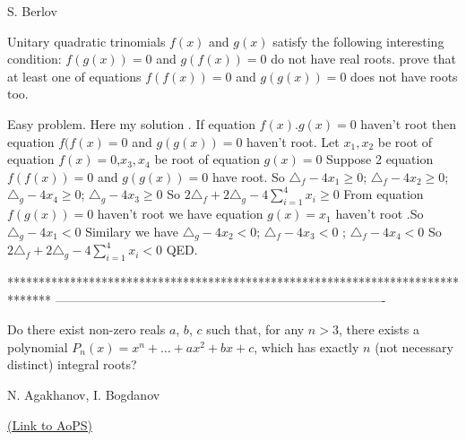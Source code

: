 \begin{solution}
	\begin{tcolorbox}\begin{italicized}S. Berlov \end{italicized}
Unitary quadratic trinomials $ f(x)$ and $ g(x)$ satisfy
the following interesting condition: $ f(g(x)) = 0$ and $ g(f(x)) = 0$ 
do not have real roots. prove that at least one of equations
$ f(f(x)) = 0$ and $ g(g(x)) = 0$ does not have roots too.\end{tcolorbox}
Easy problem. Here my solution   .
If equation $ f(x).g(x) = 0$ haven't root then equation $ f(f(x) = 0$ and $ g(g(x)) = 0$ haven't root.
Let $ x_1,x_2$ be root of equation $ f(x) = 0$,$ x_3,x_4$ be root of equation $ g(x) = 0$
Suppose 2 equation $ f(f(x)) = 0$ and $ g(g(x)) = 0$ have root.
So $ \triangle_f - 4x_1\geq 0$; $ \triangle_f - 4x_2\geq 0$; $ \triangle_g - 4x_4\geq 0$; $ \triangle_g - 4x_3\geq 0$
So $ 2\triangle_f + 2\triangle_g - 4\sum_{i = 1}^{4}x_i\geq 0$
From equation $ f(g(x)) = 0$ haven't root  we have equation $ g(x) = x_1$ haven't root .So $ \triangle_g - 4x_1 < 0$
Similary we have  $ \triangle_g - 4x_2 < 0$;  $ \triangle_f - 4x_3 < 0$ ; $ \triangle_f - 4x_4 < 0$
So $ 2\triangle_f + 2\triangle_g - 4\sum_{i = 1}^{4}x_i < 0$ QED.
\end{solution}
*******************************************************************************
-------------------------------------------------------------------------------

\begin{problem}
	Do there exist non-zero reals $a$, $b$, $c$ such that, for any $n>3$, there exists a polynomial $P_{n}(x) = x^{n}+\dots+a x^{2}+bx+c$, which has exactly $n$ (not necessary distinct) integral roots?
\begin{italicized}N. Agakhanov, I. Bogdanov\end{italicized}
	\flushright \href{https://artofproblemsolving.com/community/c6h147176}{(Link to AoPS)}
\end{problem}



